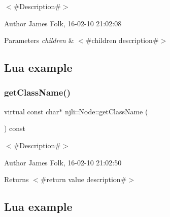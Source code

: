 $<$\#\+Description\#$>$ 

\begin{DoxyAuthor}{Author}
James Folk, 16-\/02-\/10 21\+:02\+:08
\end{DoxyAuthor}

\begin{DoxyParams}{Parameters}
{\em children} & $<$\#children description\#$>$\\
\hline
\end{DoxyParams}
\hypertarget{classnjli_1_1_steering_behavior_wander_ex1}{}\subsection{Lua example}\label{classnjli_1_1_steering_behavior_wander_ex1}

\begin{DoxyCodeInclude}
\end{DoxyCodeInclude}
\mbox{\label{classnjli_1_1_node_ad7e048703b244f6c31c8c09be8eadb25}} 
\subsubsection{\texorpdfstring{get\+Class\+Name()}{getClassName()}}
{\footnotesize\ttfamily virtual const char$\ast$ njli\+::\+Node\+::get\+Class\+Name (\begin{DoxyParamCaption}{ }\end{DoxyParamCaption}) const\hspace{0.3cm}{\ttfamily [virtual]}}



$<$\#\+Description\#$>$ 

\begin{DoxyAuthor}{Author}
James Folk, 16-\/02-\/10 21\+:02\+:50
\end{DoxyAuthor}
\begin{DoxyReturn}{Returns}
$<$\#return value description\#$>$
\end{DoxyReturn}
\hypertarget{classnjli_1_1_steering_behavior_wander_ex1}{}\subsection{Lua example}\label{classnjli_1_1_steering_behavior_wander_ex1}

\begin{DoxyCodeInclude}
\end{DoxyCodeInclude}


